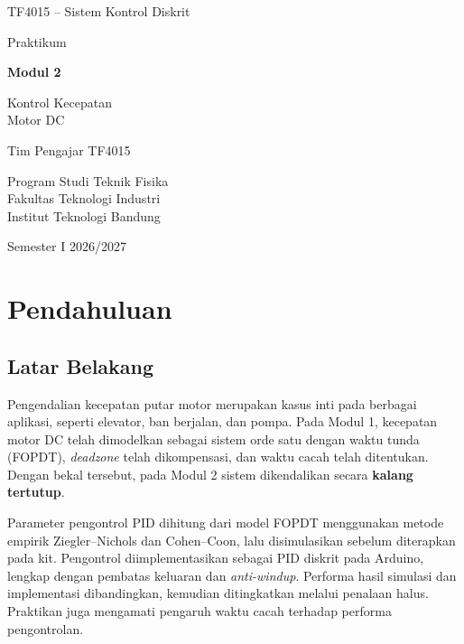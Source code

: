 \documentclass[11pt,a4paper]{article}
\begin{document}
\begin{titlepage}
\centering
\vspace*{2cm}
{\large TF4015 -- Sistem Kontrol Diskrit\par}
\vspace{2.5cm}
{\Large Praktikum\par}
\vspace{0.4cm}
{\huge\bfseries Modul 2\par}
\vspace{0.4cm}
{\LARGE Kontrol Kecepatan\\Motor DC\par}
\vfill
{\large Tim Pengajar TF4015\par}
\vspace{0.3cm}
{\large Program Studi Teknik Fisika\\Fakultas Teknologi Industri\\Institut Teknologi Bandung\par}
\vspace{0.8cm}
{\large Semester I 2026/2027\par}
\end{titlepage}

\tableofcontents
\newpage
{}
\setcounter{page}{1}

\section{Pendahuluan}
\subsection{Latar Belakang}
Pengendalian kecepatan putar motor merupakan kasus inti pada berbagai aplikasi, seperti elevator, ban berjalan, dan pompa. Pada Modul 1, kecepatan motor DC telah dimodelkan sebagai sistem orde satu dengan waktu tunda (FOPDT), \textit{deadzone} telah dikompensasi, dan waktu cacah telah ditentukan. Dengan bekal tersebut, pada Modul 2 sistem dikendalikan secara \textbf{kalang tertutup}.

Parameter pengontrol PID dihitung dari model FOPDT menggunakan metode empirik Ziegler--Nichols dan Cohen--Coon, lalu disimulasikan sebelum diterapkan pada kit. Pengontrol diimplementasikan sebagai PID diskrit pada Arduino, lengkap dengan pembatas keluaran dan \textit{anti-windup}. Performa hasil simulasi dan implementasi dibandingkan, kemudian ditingkatkan melalui penalaan halus. Praktikan juga mengamati pengaruh waktu cacah terhadap performa pengontrolan.
\end{document}

